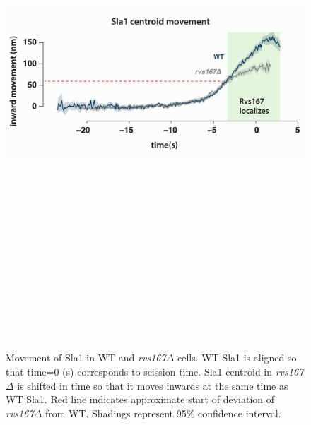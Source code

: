 	\begin{figure}[H]
		\centering
		\hspace{-1.2cm}
		\includegraphics[width=15cm,height=20cm, keepaspectratio]{figures/results_final/rvsdeletion3}
		\caption[Coat movement in \textit{rvs167$\Delta$} cells]
		{Movement of Sla1 in WT and  \textit{rvs167$\Delta$} cells. WT Sla1 is aligned so that time=0 (s) corresponds to scission time. Sla1 centroid  in \textit{rvs167$\Delta$} is shifted in time so that it moves inwards at the same time as WT Sla1. Red line indicates approximate start of deviation of \textit{rvs167$\Delta$} from WT. Shadings represent 95\% confidence interval.
			\label{fig2_rvsdelta}
		}
	\end{figure}




